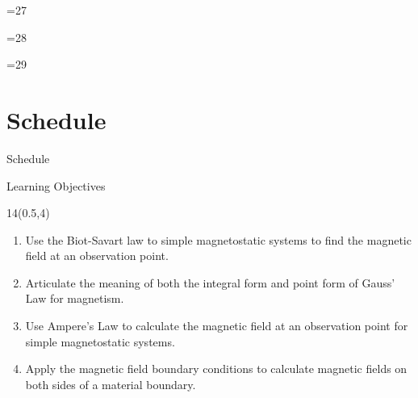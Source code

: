 \def\lessonNum{29}

\ifnum\lessonNum=27
\fi

\ifnum\lessonNum=28
\fi

\ifnum\lessonNum=29
\fi

\section{Schedule}
\begin{frame}{Schedule}
	\def\myfontsize{footnotesize}
	
\end{frame}



\begin{frame}{Learning Objectives}
	\begin{textblock}{14}(0.5,4)
	\begin{enumerate}[{3}.1]
		\item Use the Biot-Savart law to simple magnetostatic systems to find the magnetic field at an observation point. 
		\item Articulate the meaning of both the integral form and point form of Gauss' Law for magnetism.
		\item Use Ampere's Law to calculate the magnetic field at an observation point for simple magnetostatic systems.
		\item  Apply the magnetic field boundary conditions to calculate magnetic fields on both sides of a material boundary. 
	\end{enumerate}
	\end{textblock}
\end{frame}

